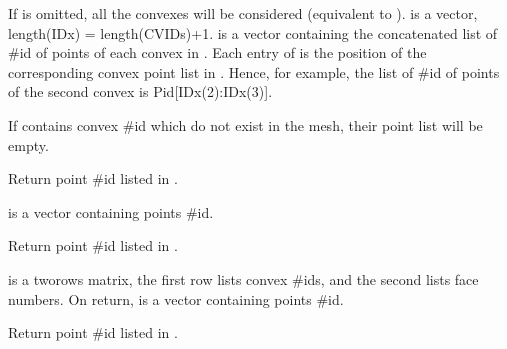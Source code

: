 \documentclass[a4paper,11pt,english]{sphinxmanual}
\begin{document}
\begin{fulllineitems}
\begin{fulllineitems}
If  is omitted, all the convexes will be considered
(equivalent to ).  is a
vector, length(IDx) = length(CVIDs)+1.  is a
vector containing the concatenated list of \#id of
points of each convex in . Each entry of  is the
position of the corresponding convex point list in . Hence,
for example, the list of \#id of points of the second convex is
Pid{[}IDx(2):IDx(3){]}.

If  contains convex \#id which do not exist in the mesh,
their point list will be empty.

\end{fulllineitems}


\begin{fulllineitems}
\label{\detokenize{python/cmdref_Mesh:getfem.Mesh.pid_in_cvids}}
Return point \#id listed in .

 is a vector containing points \#id.

\end{fulllineitems}


\begin{fulllineitems}
\label{\detokenize{python/cmdref_Mesh:getfem.Mesh.pid_in_faces}}
Return point \#id listed in .

 is a two\sphinxhyphen{}rows matrix, the first row lists convex \#ids,
and the second lists face numbers. On return,  is a
vector containing points \#id.

\end{fulllineitems}


\begin{fulllineitems}
\label{\detokenize{python/cmdref_Mesh:getfem.Mesh.pid_in_regions}}
Return point \#id listed in .


\end{fulllineitems}
\end{fulllineitems}
\end{document}
